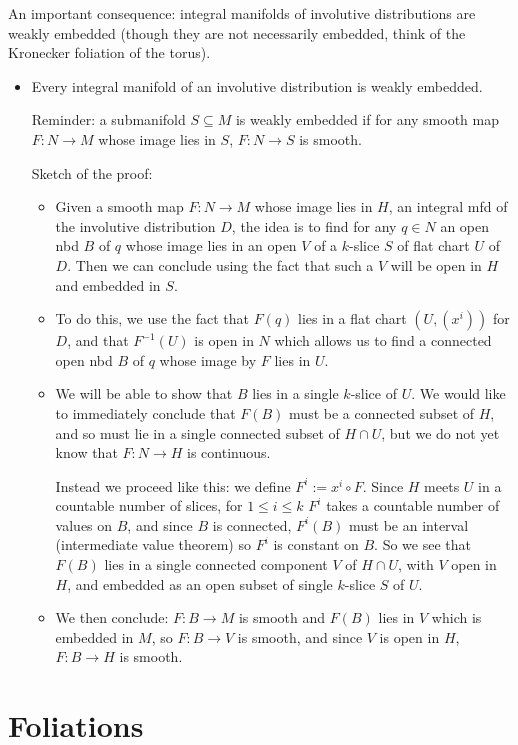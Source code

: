 \documentclass{report}
\theoremstyle{definition}
\begin{document}
An important consequence: integral manifolds of involutive distributions are weakly embedded (though they are not necessarily embedded, think of the Kronecker foliation of the torus).
\begin{itemize}
    \item Every integral manifold of an involutive distribution is weakly embedded.

    Reminder: a submanifold $S\subseteq M$ is weakly embedded if for any smooth map $F:N\to M$ whose image lies in $S$, $F:N\to S$ is smooth.

    Sketch of the proof:
    \begin{itemize}
        \item Given a smooth map $F:N\to M$ whose image lies in $H$, an integral mfd of the involutive distribution $D$, the idea is to find for any $q\in N$ an open nbd $B$ of $q$ whose image lies in an open $V$ of a $k$-slice $S$ of flat chart $U$ of $D$. Then we can conclude using the fact that such a $V$ will be open in $H$ and embedded in $S$.

        \item To do this, we use the fact that $F(q)$ lies in a flat chart $(U,(x^i))$ for $D$, and that $F^{-1}(U)$ is open in $N$ which allows us to find a connected open nbd $B$ of $q$ whose image by $F$ lies in $U$.
        \item We will be able to show that $B$ lies in a single $k$-slice of $U$. We would like to immediately conclude that $F(B)$ must be a connected subset of $H$, and so must lie in a single connected subset of $H\cap U$, but we do not yet know that $F:N\to H$ is continuous.

        Instead we proceed like this: we define $F^i:=x^i\circ F$. Since $H$ meets $U$ in a countable number of slices, for $1\leq i\leq k$ $F^i$ takes a countable number of values on $B$, and since $B$ is connected, $F^i(B)$ must be an interval (intermediate value theorem) so $F^i$ is constant on $B$. So we see that $F(B)$ lies in a single connected component $V$ of $H\cap U$, with $V$ open in $H$, and embedded as an open subset of single $k$-slice $S$ of $U$.
        \item We then conclude: $F:B\to M$ is smooth and $F(B)$ lies in $V$ which is embedded in $M$, so $F:B\to V$ is smooth, and since $V$ is open in $H$, $F:B\to H$ is smooth.
    \end{itemize}
\end{itemize}

\section{Foliations}
\end{document}
